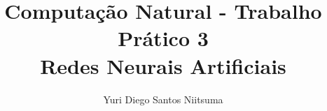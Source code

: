 \documentclass[11pt]{article}
\usepackage[margin=1.0in]{geometry}


\usepackage{xcolor,soul,framed} %

\usepackage[pdftex]{graphicx}
\graphicspath{{../pdf/}{../jpeg/}}

\usepackage{float}

\usepackage[cmex10]{amsmath}
\usepackage{array}
\usepackage{mdwmath}
\usepackage{mdwtab}
\usepackage{eqparbox}
\usepackage{url}

\usepackage[utf8]{inputenc}     %


\usepackage{algorithm}
\usepackage[noend]{algpseudocode}
\newcommand{\vect}[1]{\boldsymbol{#1}}

\usepackage{listings}


\title{Computação Natural - Trabalho Prático 3 \\ Redes Neurais Artificiais}
  \author{Yuri Diego Santos Niitsuma}

\maketitle

\section{Introdução}

O trabalho prático 3 tem compo objetivo em por em prática conceitos relacionados a redes neurais aplicado em uma classificação supervisionada. Iremos modelar uma rede neural capaz de classificar entre uma galáxia, estrela ou quasar com através de uma amostra de dados do Sloan Digital Sky Survey. Pode-se se informar mais do que se trata o SDSS no link \footnote{\url{https://pt.wikipedia.org/wiki/Sloan_Digital_Sky_Survey}}.

